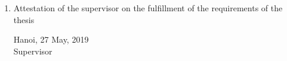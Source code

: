 \begin{requirement}
\begin{enumerate}[leftmargin=*]
	\item Attestation of the supervisor on the fulfillment of the requirements of the thesis
	\flushright
	\begin{minipage}{0.5\linewidth}
		\centering
		Hanoi, 27 May, 2019\\
		Supervisor\\
		\vspace{30pt}
		\supervisor
	\end{minipage}	
\end{enumerate}
\end{requirement}